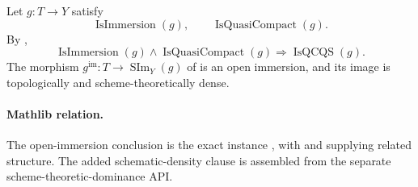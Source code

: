 \begin{lemma}
  \label{lemma:nagata-immersion-open-in-scheme-image}
  \lean{}

  Let $g\colon T\to Y$ satisfy
  \[
    \operatorname{IsImmersion}(g),
    \qquad
    \operatorname{IsQuasiCompact}(g).
  \]
  By ,
  \[
    \operatorname{IsImmersion}(g)\wedge
      \operatorname{IsQuasiCompact}(g)
        \Longrightarrow\operatorname{IsQCQS}(g).                 \tag{IO-1}
  \]
  The morphism
  $g^{\mathrm{im}}\colon T\to\operatorname{SIm}_Y(g)$ of
   is an open immersion,
  and its image is topologically and scheme-theoretically dense.

  \paragraph{Mathlib relation.}
  The open-immersion conclusion is the exact instance
  \texttt{},
  with \texttt{} and
  \texttt{} supplying
  related structure.  The added schematic-density clause is assembled from
  the separate scheme-theoretic-dominance API.
\end{lemma}

